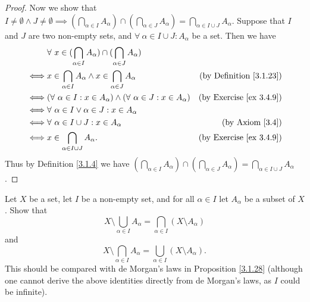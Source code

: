 \begin{proof}
    Now we show that \(I \neq \emptyset \land J \neq \emptyset \implies (\bigcap_{\alpha \in I} A_{\alpha}) \cap (\bigcap_{\alpha \in J} A_{\alpha}) = \bigcap_{\alpha \in I \cup J} A_{\alpha}\).
    Suppose that \(I\) and \(J\) are two non-empty sets, and \(\forall\ \alpha \in I \cup J : A_{\alpha}\) be a set.
    Then we have
    \begin{align*}
             & \forall\ x \in (\bigcap_{\alpha \in I} A_{\alpha}) \cap (\bigcap_{\alpha \in J} A_{\alpha})                                       \\
        \iff & x \in \bigcap_{\alpha \in I} A_{\alpha} \land x \in \bigcap_{\alpha \in J} A_{\alpha}       & \text{(by Definition \ref{3.1.23})} \\
        \iff & (\forall\ \alpha \in I : x \in A_{\alpha}) \land (\forall\ \alpha \in J : x \in A_{\alpha}) & \text{(by Exercise \ref{ex 3.4.9})} \\
        \iff & \forall\ \alpha \in I \lor \alpha \in J : x \in A_{\alpha}                                                                        \\
        \iff & \forall\ \alpha \in I \cup J : x \in A_{\alpha}                                             & \text{(by Axiom \ref{3.4})}         \\
        \iff & x \in \bigcap_{\alpha \in I \cup J} A_{\alpha}.                                             & \text{(by Exercise \ref{ex 3.4.9})}
    \end{align*}
    Thus by Definition \ref{3.1.4} we have \((\bigcap_{\alpha \in I} A_{\alpha}) \cap (\bigcap_{\alpha \in J} A_{\alpha}) = \bigcap_{\alpha \in I \cup J} A_{\alpha}\).
\end{proof}

\begin{exercise}\label{ex 3.4.11}
    Let \(X\) be a set, let \(I\) be a non-empty set, and for all \(\alpha \in I\) let \(A_{\alpha}\) be a subset of \(X\).
    Show that
    \[
        X \setminus \bigcup_{\alpha \in I} A_{\alpha} = \bigcap_{\alpha \in I} (X \setminus A_{\alpha})
    \]
    and
    \[
        X \setminus \bigcap_{\alpha \in I} A_{\alpha} = \bigcup_{\alpha \in I} (X \setminus A_{\alpha}).
    \]
    This should be compared with de Morgan’s laws in Proposition \ref{3.1.28}
    (although one cannot derive the above identities directly from de Morgan’s laws, as \(I\) could be infinite).
\end{exercise}

